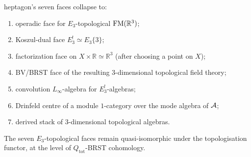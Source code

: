 \begin{theorem}
heptagon's seven faces collapse to:
\begin{enumerate}
 \item operadic face for $E_3$-topological $\mathrm{FM}(\mathbb{R}^3)$;
 \item Koszul-dual face $E_3^{!}\simeq E_3\{3\}$;
 \item factorization face on $X\times\mathbb{R}\simeq\mathbb{R}^3$
 (after choosing a point on $X$);
 \item BV/BRST face of the resulting $3$-dimensional topological
 field theory;
 \item convolution $L_\infty$-algebra for $E_3^{!}$-algebras;
 \item Drinfeld centre of a module $1$-category over the
 mode algebra of $\mathcal{A}$;
 \item derived stack of $3$-dimensional topological algebras.
\end{enumerate}
The seven $E_3$-topological faces remain quasi-isomorphic under the
topologisation functor, at the level of $Q_{\mathrm{tot}}$-BRST
cohomology.
\end{theorem}

